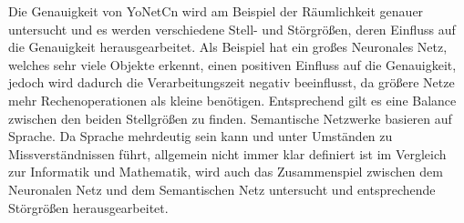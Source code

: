 Die Genauigkeit von YoNetCn wird am Beispiel der Räumlichkeit genauer untersucht und es werden verschiedene Stell- und Störgrößen, deren Einfluss auf die Genauigkeit herausgearbeitet.
Als Beispiel hat ein großes Neuronales Netz, welches sehr viele Objekte erkennt, einen positiven Einfluss auf die Genauigkeit, jedoch wird dadurch die Verarbeitungszeit negativ beeinflusst, da größere Netze mehr Rechenoperationen als kleine benötigen. Entsprechend gilt es eine Balance zwischen den beiden Stellgrößen zu finden. 
Semantische Netzwerke basieren auf Sprache. Da Sprache mehrdeutig sein kann und unter Umständen zu Missverständnissen führt, allgemein nicht immer klar definiert ist im Vergleich zur Informatik und Mathematik, wird auch das Zusammenspiel zwischen dem Neuronalen Netz und dem Semantischen Netz untersucht und entsprechende Störgrößen herausgearbeitet. 


